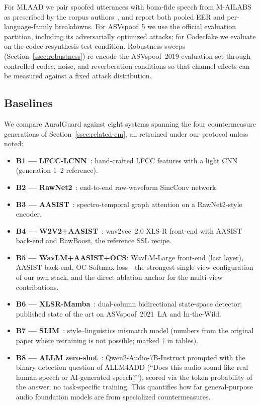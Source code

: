 For MLAAD we pair spoofed utterances with bona-fide speech from M-AILABS as prescribed
by the corpus authors~\cite{muller2024mlaad}, and report both pooled EER and
per-language-family breakdowns. For ASVspoof~5 we use the official evaluation
partition, including its adversarially optimized attacks; for Codecfake we evaluate on
the codec-resynthesis test condition. Robustness sweeps (Section~\ref{ssec:robustness})
re-encode the ASVspoof~2019 evaluation set through controlled codec, noise, and
reverberation conditions so that channel effects can be measured against a fixed attack
distribution.

\subsection{Baselines}
\label{ssec:baselines}

We compare AuralGuard against eight systems spanning the four countermeasure
generations of Section~\ref{ssec:related-cm}, all retrained under our protocol unless
noted:

\begin{itemize}
    \item \textbf{B1 --- LFCC-LCNN}~\cite{lavrentyeva2019stc}: hand-crafted LFCC
        features with a light CNN (generation 1--2 reference).
    \item \textbf{B2 --- RawNet2}~\cite{tak2021rawnet2}: end-to-end raw-waveform
        SincConv network.
    \item \textbf{B3 --- AASIST}~\cite{jung2022aasist}: spectro-temporal graph
        attention on a RawNet2-style encoder.
    \item \textbf{B4 --- W2V2+AASIST}~\cite{tak2022automatic}: wav2vec~2.0 XLS-R
        front-end with AASIST back-end and RawBoost, the reference SSL recipe.
    \item \textbf{B5 --- WavLM+AASIST+OCS}: WavLM-Large front-end (last layer), AASIST
        back-end, OC-Softmax loss---the strongest single-view configuration of our own
        stack, and the direct ablation anchor for the multi-view contributions.
    \item \textbf{B6 --- XLSR-Mamba}~\cite{xiao2025xlsrmamba}: dual-column
        bidirectional state-space detector; published state of the art on
        ASVspoof~2021~LA and In-the-Wild.
    \item \textbf{B7 --- SLIM}~\cite{zhu2024slim}: style--linguistics mismatch model
        (numbers from the original paper where retraining is not possible; marked
        $\dagger$ in tables).
    \item \textbf{B8 --- ALLM zero-shot}~\cite{gong2025allm4add,chu2024qwen2audio}:
        Qwen2-Audio-7B-Instruct prompted with the binary detection question of
        ALLM4ADD (``Does this audio sound like real human speech or AI-generated
        speech?''), scored via the token probability of the answer; no task-specific
        training. This quantifies how far general-purpose audio foundation models are
        from specialized countermeasures.
\end{itemize}

